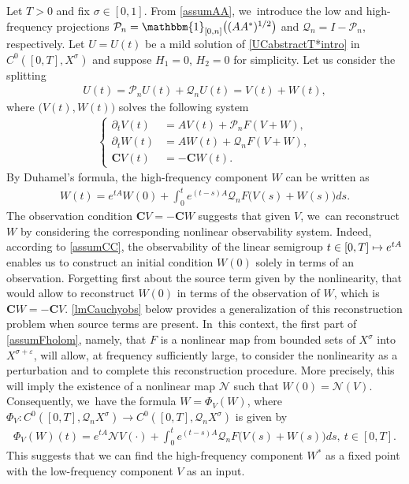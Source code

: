 \documentclass[10pt]{amsart}
\newcommand\mto{\mathchoice{\longmapsto}{\mapsto}{\mapsto}{\mapsto}}
\theoremstyle{definition}
\let\mc\mathcal
\let\veps\varepsilon
\newcommand{\Q}{\mathcal{Q}}
\renewcommand{\P}{\mathcal{P}}
\newcommand{\bC}{\boldsymbol{C}}
\begin{document}
Let $T>0$ and fix $\sigma\in [0, 1]$. From \cref{assumAA}, we~introduce the low and high-frequency projections $\P_n=\mathbbm{1}_{[0, n]}\big((AA^*)^{1/2}\big)$ and $\Q_n=I-\P_n$, respectively. Let $U=U(t)$ be a mild solution of \eqref{UCabstractT*intro} in $C^0([0, T], X^\sigma)$ and suppose $H_1=0$, $H_2=0$ for simplicity. Let us consider the splitting
\begin{align*}
U(t)=\P_n U(t)+\Q_nU(t)=V(t)+W(t),
\end{align*}
where $\big(V(t), W(t)\big)$ solves the following system
\begin{align*}
\left\{\begin{array}{rl}
\partial_t V(t)&=AV(t)+\P_n F(V+W), \\[3pt]
\partial_t W(t)&=AW(t)+\Q_n F(V+W), \\[3pt]
\bC V(t)&=-\bC W(t).
\end{array}\right.
\end{align*}
By Duhamel's formula, the high-frequency component $W$ can be written as
\begin{align*}
W(t)=e^{tA}W(0)+\int_0^t e^{(t-s)A}\Q_n F\big(V(s)+W(s)\big)ds.
\end{align*}
The observation condition $\bC V=-\bC W$ suggests that given $V$, we~can reconstruct $W$ by considering the corresponding nonlinear observability system. Indeed, according to \cref{assumCC}, the observability of the linear semigroup $t\in [0, T]\mto e^{tA}$ enables us to construct an initial condition $W(0)$ solely in terms of an observation. Forgetting first about the source term given by the nonlinearity, that would allow to reconstruct $W(0)$ in terms of the observation of $W$, which is $\bC W=-\bC V$. \cref{lmCauchyobs} below provides a generalization of this reconstruction problem when source terms are present. In~this context, the first part of \cref{assumFholom}, namely, that $F$ is a nonlinear map from bounded sets of $X^\sigma$ into $X^{\sigma+\veps}$, will allow, at frequency sufficiently large, to consider the nonlinearity as a perturbation and to complete this reconstruction procedure. More precisely, this will imply the existence of a nonlinear map $\mc{N}$ such that $W(0)=\mc{N}(V)$. Consequently, we~have the formula $W=\Phi_V(W)$, where $\Phi_V: C^0([0, T], \Q_nX^\sigma)\to C^0([0, T], \Q_nX^\sigma)$ is given by
\begin{align*}
\Phi_V(W)(t)=e^{tA}\mc{N}V(\cdot)+\int_0^t e^{(t-s)A}\Q_n F\big(V(s)+W(s)\big)ds,\ t\in [0, T].
\end{align*}
This suggests that we can find the high-frequency component $W^*$ as a fixed point with the low-frequency component $V$ as an input.
\end{document}

